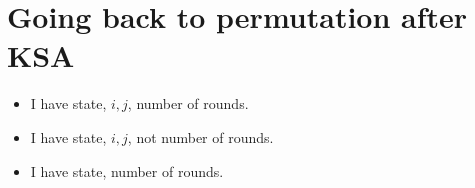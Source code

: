 \chapter{Going back to permutation after KSA}

\begin{itemize}
	\item I have state, $ i,j $, number of rounds. 
	\item I have state, $ i,j $, not number of rounds. 
	\item I have state, number of rounds. 
\end{itemize}